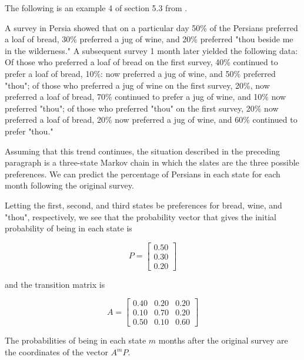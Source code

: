 \documentclass{amsart}
\theoremstyle{definition}
\theoremstyle{remark}
\numberwithin{equation}{section}
\begin{document}
The following is an example 4 of section 5.3 from \cite{friedberg2003linear}.

\begin{displayquote}
	A survey in Persia showed that on a particular day 50\% of the Persians preferred a loaf of bread, 30\% preferred a jug of wine, and 20\% preferred "thou beside me in the wilderness." 
	A subsequent survey 1 month later yielded the following data: Of those who preferred a loaf of bread on the first survey, 40\% continued to prefer a loaf of bread, 10\%: now preferred a jug of wine, and 50\% preferred "thou"; of those who preferred a jug of wine on the first survey, 20\%, now preferred a loaf of bread, 70\% continued to prefer a jug of wine, and 10\% now preferred "thou"; of those who preferred "thou" on the first survey, 20\% now preferred a loaf of bread, 20\% now preferred a jug of wine, and 60\% continued to prefer "thou."

	Assuming that this trend continues, the situation described in the preceding paragraph is a three-state Markov chain in which the slates are the three possible preferences. We can predict the percentage of Persians in each state for each month following the original survey. 
\end{displayquote}

Letting the first, second, and third states be preferences for bread, wine, and "thou", respectively, we see that the probability vector that gives the initial probability of being in each state is

\begin{equation}
    P = \begin{bmatrix}
           0.50 \\
           0.30 \\
           0.20
         \end{bmatrix}
\end{equation}

and the transition matrix is

\begin{equation}
    A = \begin{bmatrix}
           0.40 & 0.20 & 0.20  \\
           0.10 & 0.70 & 0.20 \\
           0.50 & 0.10 & 0.60
         \end{bmatrix}
\end{equation}

The probabilities of being in each state $m$ months after the original survey are the coordinates of the vector $A^mP$.
\end{document}
